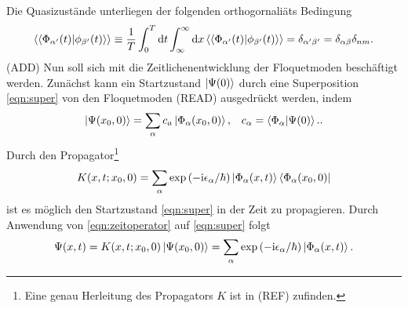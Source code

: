 Die Quasizustände unterliegen der folgenden orthogornaliäts Bedingung
\begin{align}
  \braket{\braket{\Phi_{\alpha' }(t)|\phi_{\beta'}(t)}}\equiv \frac{1}{T} \int_0^T\mathrm{d}t \int_{\infty}^{\infty} \mathrm{d}x
   \braket{\braket{\Phi_{\alpha' }(t)|\phi_{\beta'}(t)}}=\delta_{\alpha'\beta'}=\delta_{\alpha\beta}\delta_{nm}.
\end{align}
(ADD)
Nun soll sich mit die Zeitlichenentwicklung der Floquetmoden
beschäftigt werden.
Zunächst kann ein Startzustand $\ket{\Psi(0)}$ durch eine
Superposition \eqref{eqn:super} von den Floquetmoden (READ) ausgedrückt werden, indem
\begin{align}
  \ket{\Psi(x_0,0)}=\sum_\alpha c_a\ket{\Phi_\alpha(x_0,0)},&   &c_\alpha=\braket{\Phi_\alpha|\Psi(0)}.  \label{eqn:super}.
\end{align}
Durch den Propagator\footnote{Eine genau Herleitung des Propagators $K$ ist in (REF) zufinden.}
\begin{align}
  K(x,t;x_0,0)=\sum_\alpha \exp\left(-\mathrm{i}\epsilon_\alpha/ \hbar \right)\ket{\Phi_\alpha(x,t)}\bra{\Phi_\alpha(x_0,0)} \label{eqn:zeitoperator}
\end{align}
ist es möglich den Startzustand \eqref{eqn:super}
in der Zeit zu propagieren.
Durch Anwendung von \eqref{eqn:zeitoperator} auf \eqref{eqn:super}
folgt
\begin{align}
  \Psi(x,t)=K(x,t;x_0,0) \ket{\Psi(x_0,0)}=\sum_\alpha \exp\left(-\mathrm{i}\epsilon_\alpha/ \hbar \right)\ket{\Phi_\alpha(x,t)}.
\end{align}

